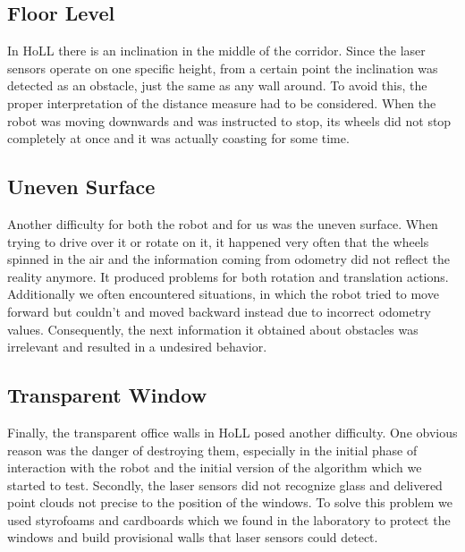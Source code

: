 \subsection{Floor Level}
In HoLL there is an inclination in the middle of the corridor. Since the laser sensors operate on one specific height, from a certain point the inclination was detected as an obstacle, just the same as any wall around. To avoid this, the proper interpretation of the distance measure had to be considered.
When the robot was moving downwards and was instructed to stop, its wheels did not stop completely at once and it was actually coasting for some time.

\subsection{Uneven Surface}
Another difficulty for both the robot and for us was the uneven surface. When trying to drive over it or rotate on it, it happened very often that the wheels spinned in the air and the information coming from odometry did not reflect the reality anymore. It produced problems for both rotation and translation actions. Additionally we often encountered situations, in which the robot tried to move forward but couldn't and moved backward  instead due to incorrect odometry values. Consequently, the next information it obtained about obstacles was irrelevant and resulted in a undesired behavior.

\subsection{Transparent Window}
Finally, the transparent office walls in HoLL posed another difficulty. One obvious reason was the danger of destroying them, especially in the initial phase of interaction with the robot and the initial version of the algorithm which we started to test. Secondly, the laser sensors did not recognize glass and delivered point clouds not precise to the position of the windows. To solve this problem we used styrofoams and cardboards which we found in the laboratory to protect the windows and build provisional walls that laser sensors could detect.

